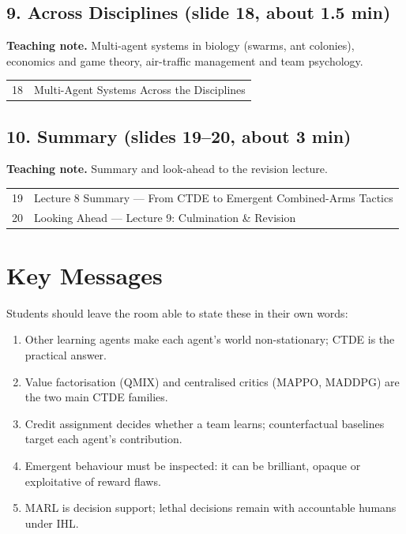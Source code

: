 \documentclass[11pt]{article}
\begin{document}
\subsection{9. Across Disciplines \normalfont\small\color{GreyN}(slide 18, about 1.5 min)}

\textbf{Teaching note.} Multi-agent systems in biology (swarms, ant colonies), economics and game theory, air-traffic management and team psychology.

\begin{center}\small\renewcommand{\arraystretch}{1.1}\begin{tabularx}{\textwidth}{@{}r X@{}}18 & Multi-Agent Systems Across the Disciplines\\\end{tabularx}\end{center}

\subsection{10. Summary \normalfont\small\color{GreyN}(slides 19--20, about 3 min)}

\textbf{Teaching note.} Summary and look-ahead to the revision lecture.

\begin{center}\small\renewcommand{\arraystretch}{1.1}\begin{tabularx}{\textwidth}{@{}r X@{}}19 & Lecture 8 Summary --- From CTDE to Emergent Combined-Arms Tactics\\
20 & Looking Ahead --- Lecture 9: Culmination \& Revision\\\end{tabularx}\end{center}

\section{Key Messages}Students should leave the room able to state these in their own words:\begin{keypoint}\begin{enumerate}\item Other learning agents make each agent's world non-stationary; CTDE is the practical answer.\item Value factorisation (QMIX) and centralised critics (MAPPO, MADDPG) are the two main CTDE families.\item Credit assignment decides whether a team learns; counterfactual baselines target each agent's contribution.\item Emergent behaviour must be inspected: it can be brilliant, opaque or exploitative of reward flaws.\item MARL is decision support; lethal decisions remain with accountable humans under IHL.\end{enumerate}\end{keypoint}
\end{document}
